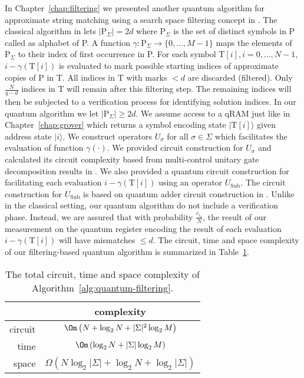 In Chapter~\ref{chap:filtering} we presented another quantum algorithm for approximate string matching using a search space filtering concept in \cite{Amir2004}. The classical algorithm in \cite{Amir2004} lets $\vert \mathrm{P}_{\Sigma} \vert = 2d$ where $\mathrm{P}_{\Sigma}$ is the set of distinct symbols in P called as alphabet of P. A function $\gamma: \mathrm{P}_{\Sigma} \rightarrow \{0,\ldots,M-1\}$ maps the elements of $\mathrm{P}_{\Sigma}$ to their index of first occurrence in P. For each symbol $\mathrm{T}[i], i=0,\ldots,N-1$, $i - \gamma(\mathrm{T}[i])$ is evaluated to mark possible starting indices of approximate copies of P in T. All indices in T with marks $< d$ are discarded (filtered). Only $\frac{N}{q-d}$ indices in T will remain after this filtering step. The remaining indices will then be subjected to a verification process for identifying solution indices. In our quantum algorithm we let $\vert \mathrm{P}_{\Sigma} \vert \geq 2d$. We assume access to a qRAM just like in Chapter~\ref{chap:grover} which returns a symbol encoding state $\vert \mathrm{T}[i] \rangle$ given address state $\vert i \rangle$. We construct operators $U_{\sigma}$ for all $\sigma \in \Sigma$ which facilitates the evaluation of function $\gamma(\cdot)$. We provided circuit construction for $U_{\sigma}$ and calculated its circuit complexity based from multi-control unitary gate decomposition results in \cite{Barenco1995b}. We also provided a quantum circuit construction for facilitating each evaluation $i - \gamma(\mathrm{T}[i])$ using an operator $U_{\mathrm{Sub}}$. The circuit construction for $U_{\mathrm{Sub}}$ is based on quantum adder circuit construction in \cite{Barenco1996}. Unlike in the classical setting, our quantum algorithm do not include a verification phase. Instead, we are assured that with probability $\frac{c_{i_k}}{N}$, the result of our measurement on the quantum register encoding the result of each evaluation $i - \gamma(\mathrm{T}[i])$ will have mismatches $\leq d$. The circuit, time and space complexity of our filtering-based quantum algorithm is summarized in Table~\ref{tab:conclusion-filtering-based-algorithm-complexities}.

\begin{table}[h!]
	\centering
	\begin{tabular}{| r || c |}
		\hline
		\quad            & complexity \\
		\hline\hline
		circuit           & $\Om\left(N + \log_2 N + \vert \Sigma \vert^2\log_2 M \right)$\\
		\hline
		time             & $\Om\left( \log_2 N + \vert \Sigma \vert\log_2 M \right)$\\
		\hline
		space           & $\Omega\left( N\log_2\vert \Sigma \vert + \log_2 N + \log_2 \vert \Sigma \vert \right)$\\
		\hline
	\end{tabular}
	\caption{The total circuit, time and space complexity of Algorithm~\ref{alg:quantum-filtering}.}
	\label{tab:conclusion-filtering-based-algorithm-complexities}
\end{table}

